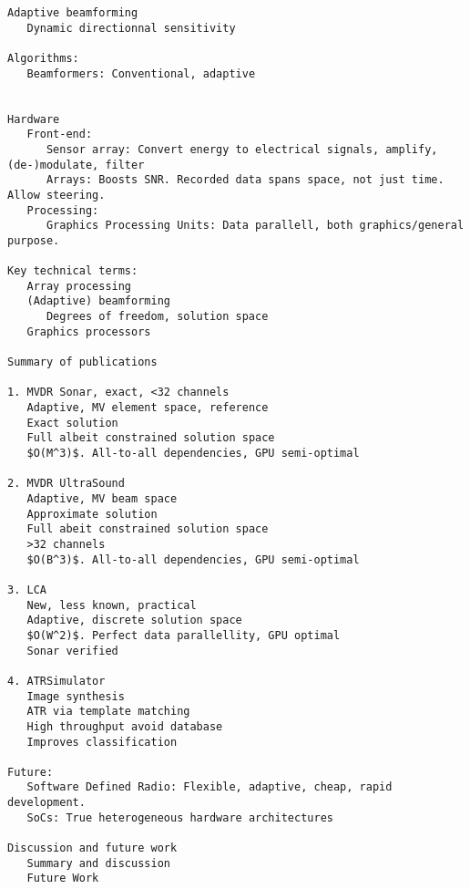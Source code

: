 {\begin{lstlisting}
Adaptive beamforming
   Dynamic directionnal sensitivity

Algorithms:
   Beamformers: Conventional, adaptive
   

Hardware
   Front-end: 
      Sensor array: Convert energy to electrical signals, amplify, (de-)modulate, filter
      Arrays: Boosts SNR. Recorded data spans space, not just time. Allow steering.
   Processing:
      Graphics Processing Units: Data parallell, both graphics/general purpose.
      
Key technical terms:
   Array processing
   (Adaptive) beamforming
      Degrees of freedom, solution space
   Graphics processors

Summary of publications

1. MVDR Sonar, exact, <32 channels
   Adaptive, MV element space, reference
   Exact solution
   Full albeit constrained solution space
   $O(M^3)$. All-to-all dependencies, GPU semi-optimal
    
2. MVDR UltraSound
   Adaptive, MV beam space
   Approximate solution
   Full abeit constrained solution space 
   >32 channels
   $O(B^3)$. All-to-all dependencies, GPU semi-optimal
   
3. LCA
   New, less known, practical
   Adaptive, discrete solution space
   $O(W^2)$. Perfect data parallellity, GPU optimal
   Sonar verified
   
4. ATRSimulator
   Image synthesis
   ATR via template matching
   High throughput avoid database
   Improves classification
   
Future:
   Software Defined Radio: Flexible, adaptive, cheap, rapid development.
   SoCs: True heterogeneous hardware architectures
   
Discussion and future work
   Summary and discussion
   Future Work
\end{lstlisting}




%
%
%
%
%
%
%
%
%
%
%



}
